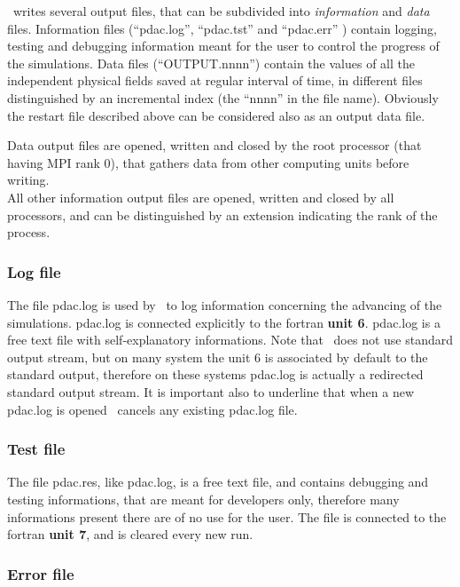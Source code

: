 \PDAC\ writes several output files, that can be subdivided into 
{\em information} and {\em data} files. 
Information files (``pdac.log'', ``pdac.tst'' and
``pdac.err'' ) contain logging, testing and debugging information
meant for the user to control the progress of the simulations.
Data files (``OUTPUT.nnnn'') contain the values of all the 
independent physical fields saved at regular interval of time, in different 
files distinguished by an incremental index (the ``nnnn'' in the file name).
Obviously the restart file described above can be considered also as an 
output data file.

Data output files are opened,
written and closed by the root processor (that having MPI rank 0), 
that gathers data from other computing units before writing. \\
All other information output files 
are opened, written and closed by all processors, and can be distinguished
by an extension indicating the rank of the process. 

\subsubsection{Log file}
\label{section:padc_log}

The file pdac.log is used by \PDAC\ to log information
concerning the advancing of the simulations. pdac.log is 
connected explicitly to the fortran {\bf unit 6}. 
pdac.log is a free text file with self-explanatory informations.
Note that \PDAC\ does not use standard output stream, but on many
system the unit 6 is associated by default to the standard output, therefore
on these systems pdac.log is actually a redirected standard output stream.
It is important also to underline that when a new pdac.log is opened 
\PDAC\ cancels any existing pdac.log file.

\subsubsection{Test file}
\label{section:padc_tst}

The file pdac.res, like pdac.log, is a free text file, and contains debugging
and testing informations, that are meant for developers only,
therefore many informations present there are of no use for the user.
The file is connected to the fortran {\bf unit 7}, and is cleared every new run.

\subsubsection{Error file}
\label{section:padc_err}

